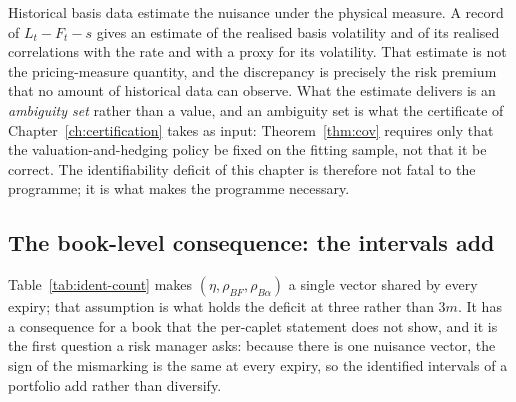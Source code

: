 \documentclass[../../../main.tex]{subfiles}
\begin{document}
Historical basis data estimate the nuisance under the physical measure. A record of $L_t-F_t-s$ gives an estimate of the realised basis volatility and of its realised correlations with the rate and with a proxy for its volatility. That estimate is not the pricing-measure quantity, and the discrepancy is precisely the risk premium that no amount of historical data can observe. What the estimate delivers is an \emph{ambiguity set} rather than a value, and an ambiguity set is what the certificate of Chapter~\ref{ch:certification} takes as input: Theorem~\ref{thm:cov} requires only that the valuation-and-hedging policy be fixed on the fitting sample, not that it be correct. The identifiability deficit of this chapter is therefore not fatal to the programme; it is what makes the programme necessary.


\subsection{The book-level consequence: the intervals add}\label{subsec:ident-book}

Table~\ref{tab:ident-count} makes $(\eta,\rho_{BF},\rho_{B\alpha})$ a single vector shared by every expiry; that assumption is what holds the deficit at three rather than $3m$. It has a consequence for a book that the per-caplet statement does not show, and it is the first question a risk manager asks: because there is one nuisance vector, the sign of the mismarking is the same at every expiry, so the identified intervals of a portfolio add rather than diversify.
\end{document}
